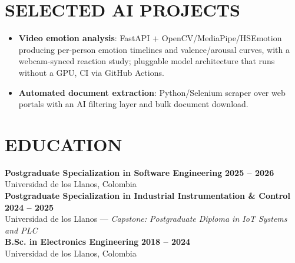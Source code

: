 \documentclass[letterpaper,10pt]{article}
\begin{document}
\section{SELECTED AI PROJECTS}
\begin{itemize}
    \item \textbf{Video emotion analysis}: FastAPI + OpenCV/MediaPipe/HSEmotion producing per-person emotion timelines and valence/arousal curves, with a webcam-synced reaction study; pluggable model architecture that runs without a GPU, CI via GitHub Actions.
    \item \textbf{Automated document extraction}: Python/Selenium scraper over web portals with an AI filtering layer and bulk document download.
\end{itemize}

\section{EDUCATION}
\textbf{Postgraduate Specialization in Software Engineering} \hfill \textbf{2025 -- 2026} \\
Universidad de los Llanos, Colombia \\
\textbf{Postgraduate Specialization in Industrial Instrumentation \& Control} \hfill \textbf{2024 -- 2025} \\
Universidad de los Llanos --- \textit{Capstone: Postgraduate Diploma in IoT Systems and PLC} \\
\textbf{B.Sc. in Electronics Engineering} \hfill \textbf{2018 -- 2024} \\
Universidad de los Llanos, Colombia
\end{document}

